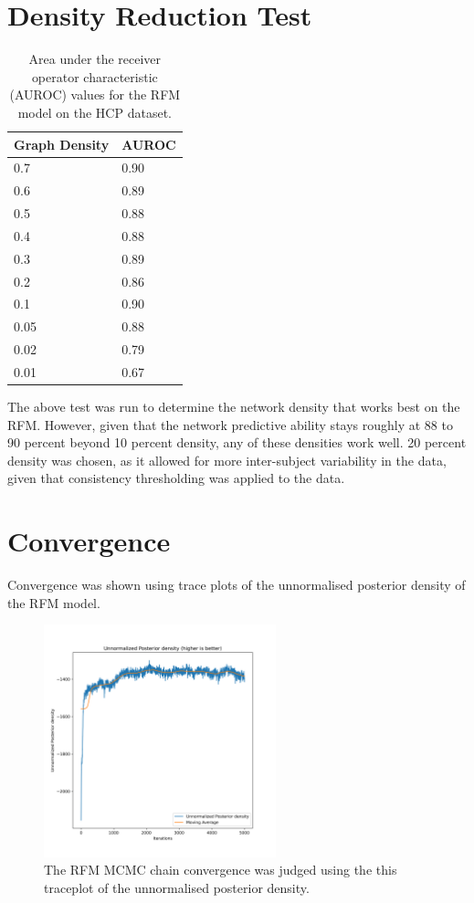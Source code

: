 \documentclass[11pt]{report} %
\begin{document}
\section{Density Reduction Test}
\begin{table}[h]
\caption{Area under the receiver operator characteristic (AUROC) values for the RFM model on the HCP dataset.}
\begin{tabular}{|l|l|}
\hline
 \textbf{Graph Density} & \textbf{AUROC} \\ \hline
 0.7 &  0.90   \\ \hline
  0.6 & 0.89  \\ \hline
 0.5 & 0.88  \\ \hline
 0.4 & 0.88 \\ \hline
 0.3 &  0.89  \\ \hline
 0.2 & 0.86  \\ \hline
 0.1 & 0.90  \\ \hline
 0.05 & 0.88  \\ \hline
 0.02 & 0.79  \\ \hline
 0.01 & 0.67  \\ \hline
\end{tabular}
\end{table}
\noindent
The above test was run to determine the network density that works best on the RFM. However, given that the network predictive ability stays roughly at 88 to 90 percent beyond 10 percent density, any of these densities work well. 20 percent density was chosen, as it allowed for more inter-subject variability in the data, given that consistency thresholding was applied to the data.
\section{Convergence}
Convergence was shown using trace plots of the unnormalised posterior density of the RFM model.
\begin{figure}[H]
    \center
    \includegraphics[width= 0.6\textwidth]{unnormalizedposteriordensity}%
    \caption{The RFM MCMC chain convergence was judged using the this traceplot of the unnormalised posterior density.}
\end{figure}

\nocite{funke2019}

\end{document}

